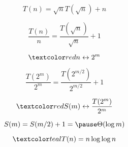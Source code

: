 \begin{frame}{}
  \[
    \boxed{T(n) = \sqrt{n} T(\sqrt{n}) + n}
  \]

  \pause
  \[
    \frac{T(n)}{n} = \frac{T(\sqrt{n})}{\sqrt{n}} + 1
  \]

  \pause
  \[
    \red{n \leftrightarrow 2^m}
  \]

  \pause
  \[
    \frac{T(2^m)}{2^m} = \frac{T(2^{m/2})}{2^{m/2}} + 1
  \]

  \pause
  \[
    \red{S(m) \leftrightarrow \frac{T(2^m)}{2^m}}
  \]

  \pause
  \[
    S(m) = S(m/2) + 1 = \pause \Theta(\log m)
  \]

  \pause
  \vspace{-0.60cm}
  \[
    \teal{T(n) = n \log \log n}
  \]
\end{frame}
